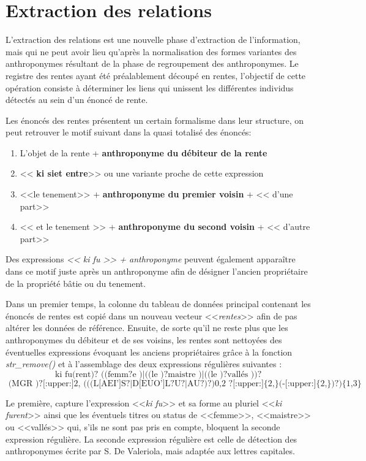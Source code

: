\section{Extraction des relations}
L'extraction des relations est une nouvelle phase d'extraction de l'information, mais qui ne peut avoir lieu qu'après la normalisation des formes variantes des anthroponymes résultant de la phase de regroupement des anthroponymes.
Le registre des rentes ayant été préalablement découpé en rentes, l'objectif de cette opération consiste à déterminer les liens qui unissent les différentes individus détectés au sein d'un énoncé de rente.

Les énoncés des rentes présentent un certain formalisme dans leur structure, on peut retrouver le motif suivant dans la quasi totalisé des énoncés: 
\begin{enumerate}
\item L'objet de la rente +  \textbf{anthroponyme du débiteur de la rente}
\item << \textbf{ki siet entre}>> ou une variante proche de cette expression
\item <<le tenement>> +  \textbf{anthroponyme du premier voisin } + << d'une part>> 
\item << et le tenement >> + \textbf{anthroponyme du second voisin} + << d'autre part>>
\end{enumerate}
Des expressions \textit{<< ki fu >> + anthroponyme} peuvent également apparaître dans ce motif juste après un anthroponyme afin de désigner l'ancien propriétaire de la propriété bâtie ou du tenement. 

Dans un premier temps, la colonne du tableau de données principal contenant les énoncés de rentes est copié dans un nouveau vecteur <<\textit{rentes}>> afin de pas altérer les données de référence. Ensuite, de sorte qu'il ne reste plus que les anthroponymes du débiteur et de ses voisins, les rentes sont nettoyées des éventuelles expressions évoquant les anciens propriétaires grâce à la fonction \textit{str\_remove()} et à l'assemblage des deux expressions régulières suivantes : 
\[ \boxed{ 
    \text{ki fu(rent)? ((femm?e )|((le )?maistre )|((le )?vallés ))? }
    }
\]
\[ \boxed{ 
    \text{ 
        (MGR )?[:upper:]{2,} (((L[AEI']S?|D[EUO']L?U?|AU?)?){0,2} ?[:upper:]\{2,\}(-[:upper:]\{2,\})?)\{1,3\} }
    }
\]

Le première, capture l'expression <<\textit{ki fu}>> et sa forme au pluriel <<\textit{ki furent}>> ainsi que les éventuels titres ou status de <<femme>>, <<maistre>> ou <<vallés>> qui, s'ils ne sont pas pris en compte, bloquent la seconde expression régulière. La seconde expression régulière est celle de détection des anthroponymes écrite par S. De Valeriola, mais adaptée aux lettres capitales.

